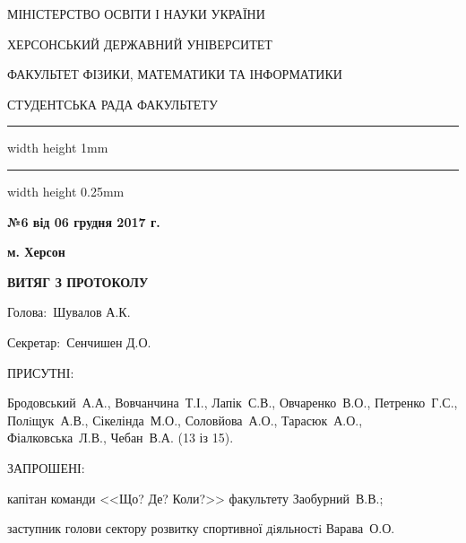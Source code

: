 \documentclass[
	a4paper,
	12pt,
	oneside,
	draft
]{extreport}
\newcommand{\heading}{\begin{center}
\parindent=0cm\parskip=-0.1cm\bfseries\footnotesize
\par МІНІСТЕРСТВО ОСВІТИ І НАУКИ УКРАЇНИ
\par ХЕРСОНСЬКИЙ ДЕРЖАВНИЙ УНІВЕРСИТЕТ
\par ФАКУЛЬТЕТ ФІЗИКИ, МАТЕМАТИКИ ТА ІНФОРМАТИКИ
\parskip=-0.2cm\par\large СТУДЕНТСЬКА РАДА ФАКУЛЬТЕТУ
\par\hrule width \hsize height 1mm \kern 0.25mm \hrule width \hsize height 0.25mm
\end{center}}
\newcommand{\Requisites}[4]{\par\noindent
\begin{minipage}[t]{80mm}
	\begin{minipage}[t]{\textwidth}
		{\par\noindent\textbf{№#1 від #2}}
	\end{minipage}
	\par	
	\begin{minipage}[t]{\textwidth}
		{\par\noindent #3}	
	\end{minipage}
\end{minipage}
\hfill
\begin{minipage}[t]{60mm}
	\par\noindent #4
\end{minipage}
}
\newcommand{\Attendees}[1]{{\par\noindent ПРИСУТНІ: \par #1}}
\newcommand{\Invented}[1]{{\par\noindent ЗАПРОШЕНІ: \par #1}}
\begin{document}
\pagestyle{empty}
\heading
\Requisites
{6}
{06 грудня 2017 г.}
{}{\hfill\bfseries  м. Херсон}

\begin{center}\textbf{ВИТЯГ З ПРОТОКОЛУ}\end{center}

\par\noindent Голова:~Шувалов А.К.
\par\noindent Секретар:~Сенчишен Д.О.

\Attendees{
Бродовський~А.А.,
Вовчанчина~Т.І.,
Лапік~С.В.,
Овчаренко~В.О.,
Петренко~Г.С.,
Полiщук~А.В.,
Сікелінда~М.О.,
Соловйова~А.О.,
Тарасюк~А.О.,
Фіалковська~Л.В.,
Чебан~В.А.
(13 із 15).}

\Invented{
капітан команди <<Що? Де? Коли?>> факультету Заобурний~В.В.;

заступник голови сектору розвитку спортивної дiяльностi Варава~О.О.}
\end{document}
